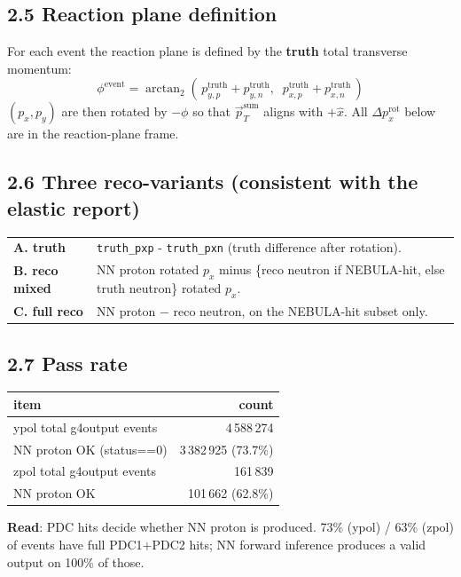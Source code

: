 \documentclass[a4paper,11pt]{article}
\begin{document}
\subsection*{2.5 Reaction plane definition}
For each event the reaction plane is defined by the \textbf{truth} total transverse momentum:
\[
    \phi^\text{event} = \arctan_2(\,p_{y,p}^\text{truth} + p_{y,n}^\text{truth},\;\; p_{x,p}^\text{truth} + p_{x,n}^\text{truth}\,)
\]
$(p_x, p_y)$ are then rotated by $-\phi$ so that $\vec p_T^\text{sum}$ aligns with $+\hat x$. All $\Delta p_x^\text{rot}$ below are in the reaction-plane frame.

\subsection*{2.6 Three reco-variants (consistent with the elastic report)}
\begin{tabular}{lp{12cm}}
\toprule
\textbf{A. truth}       & \texttt{truth\_pxp} - \texttt{truth\_pxn} (truth difference after rotation). \\
\textbf{B. reco mixed}  & NN proton rotated $p_x$ minus \{reco neutron if NEBULA-hit, else truth neutron\} rotated $p_x$. \\
\textbf{C. full reco}   & NN proton $-$ reco neutron, on the NEBULA-hit subset only. \\
\bottomrule
\end{tabular}

\subsection*{2.7 Pass rate}
\begin{table}[H]
\centering\footnotesize
\begin{tabular}{lr}
\toprule
item & count \\
\midrule
ypol total g4output events      & 4\,588\,274 \\
\quad NN proton OK (status==0)  & 3\,382\,925 (73.7\%) \\
zpol total g4output events      & 161\,839 \\
\quad NN proton OK              & 101\,662 (62.8\%) \\
\bottomrule
\end{tabular}
\end{table}
\textbf{Read}: PDC hits decide whether NN proton is produced. 73\% (ypol) / 63\% (zpol) of events have full PDC1+PDC2 hits; NN forward inference produces a valid output on 100\% of those.
\end{document}
